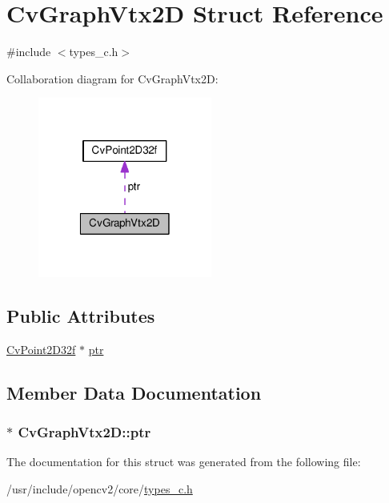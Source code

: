 \hypertarget{structCvGraphVtx2D}{\section{Cv\-Graph\-Vtx2\-D Struct Reference}
\label{structCvGraphVtx2D}
}


{\ttfamily \#include $<$types\-\_\-c.\-h$>$}



Collaboration diagram for Cv\-Graph\-Vtx2\-D\-:\nopagebreak
\begin{figure}[H]
\begin{center}
\leavevmode
\includegraphics[width=162pt]{structCvGraphVtx2D__coll__graph}
\end{center}
\end{figure}
\subsection*{Public Attributes}
\begin{DoxyCompactItemize}
\item 
\hyperlink{structCvPoint2D32f}{Cv\-Point2\-D32f} $\ast$ \hyperlink{structCvGraphVtx2D_abe7a98289ea73c81f00d71df40f493fc}{ptr}
\end{DoxyCompactItemize}


\subsection{Member Data Documentation}
\hypertarget{structCvGraphVtx2D_abe7a98289ea73c81f00d71df40f493fc}{
\subsubsection[{ptr}]{$\ast$ Cv\-Graph\-Vtx2\-D\-::ptr}}\label{structCvGraphVtx2D_abe7a98289ea73c81f00d71df40f493fc}


The documentation for this struct was generated from the following file\-:\begin{DoxyCompactItemize}
\item 
/usr/include/opencv2/core/\hyperlink{core_2types__c_8h}{types\-\_\-c.\-h}\end{DoxyCompactItemize}
